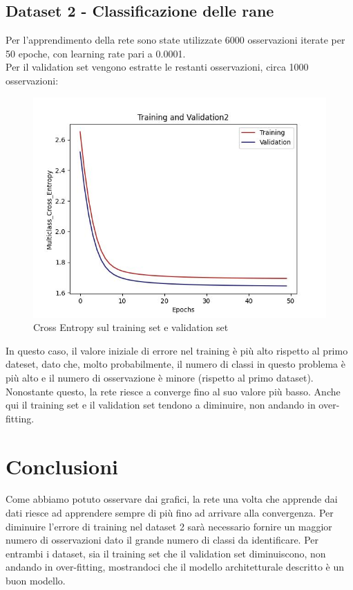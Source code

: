 \documentclass{article}
\begin{document}
        \subsection{Dataset 2 - Classificazione delle rane}\label{subsec:dataset-2---classificazione-delle-rane}
            Per l'apprendimento della rete sono state utilizzate 6000 osservazioni iterate per 50 epoche, con learning rate pari a 0.0001.\\
            Per il validation set vengono estratte le restanti osservazioni, circa 1000 osservazioni:
            \begin{figure}[H]
                \centering
                \includegraphics[scale=0.50]{lossval2}
                \caption{Cross Entropy sul training set e validation set}
                \label{fig:figure4}
            \end{figure}
            \newpage
            In questo caso, il valore iniziale di errore nel training è più alto rispetto al primo dateset,
            dato che, molto probabilmente, il numero di classi in questo problema è più alto e il numero di osservazione è minore (rispetto al primo dataset).
            Nonostante questo, la rete riesce a converge fino al suo valore più basso.
            Anche qui il training set e il validation set tendono a diminuire, non andando in over-fitting.
    \section{Conclusioni}\label{sec:conclusioni}
        Come abbiamo potuto osservare dai grafici, la rete una volta che apprende dai dati riesce ad apprendere sempre di più fino ad arrivare alla convergenza.
        Per diminuire l'errore di training nel dataset 2 sarà necessario fornire un maggior numero di osservazioni dato il grande numero di classi da identificare.
        Per entrambi i dataset, sia il training set che il validation set diminuiscono, non andando in over-fitting, mostrandoci che il modello architetturale descritto è un buon modello.
\end{document}
